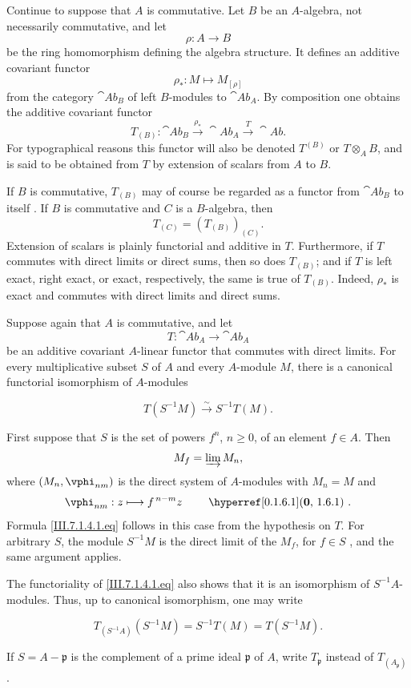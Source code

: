 \begin{env}[7.1.3]
\label{III.7.1.3}
Continue to suppose that $A$ is commutative.  Let $B$ be an
$A$-algebra, not necessarily commutative, and let
\[
  \rho:A\longrightarrow B
\]
be the ring homomorphism defining the algebra structure.  It
defines an additive covariant functor
\[
  \rho_*:M\longmapsto M_{[\rho]}
\]
from the category $\cat{Ab}_B$ of left $B$-modules to
$\cat{Ab}_A$.  By composition one obtains the additive
covariant functor
\[
  T_{(B)}:
  \cat{Ab}_B
  \xrightarrow{\rho_*}
  \cat{Ab}_A
  \xrightarrow{T}
  \cat{Ab}.
\]
For typographical reasons this functor will also be denoted
$T^{(B)}$ or $T\otimes_AB$, and is said to be obtained from $T$
by extension of scalars from $A$ to $B$.

If $B$ is commutative, $T_{(B)}$ may of course be regarded as a
functor from $\cat{Ab}_B$ to itself .  If $B$ is
commutative and $C$ is a $B$-algebra, then
\[
  T_{(C)}=(T_{(B)})_{(C)}.
\]
Extension of scalars is plainly functorial and additive in
$T$.  Furthermore, if $T$ commutes with direct limits or direct
sums, then so does $T_{(B)}$; and if $T$ is left exact, right
exact, or exact, respectively, the same is true of $T_{(B)}$.
Indeed, $\rho_*$ is exact and commutes with direct limits and
direct sums.
\end{env}

\begin{env}[7.1.4]
\label{III.7.1.4}
Suppose again that $A$ is commutative, and let
\[
  T:\cat{Ab}_A\longrightarrow\cat{Ab}_A
\]
be an additive covariant $A$-linear functor that commutes with
direct limits.  For every multiplicative subset $S$ of $A$ and
every $A$-module $M$, there is a canonical functorial
isomorphism of $A$-modules
\begin{env}[7.1.4.1]
\label{III.7.1.4.1}
\[
  T(S^{-1}M)
  \xrightarrow{\sim}
  S^{-1}T(M).
  \tag{7.1.4.1}\label{III.7.1.4.1.eq}
\]
\end{env}

First suppose that $S$ is the set of powers $f^n$,
$n\geq0$, of an element $f\in A$.  Then
\[
  M_f=\varinjlim M_n,
\]
where $(M_n,\vphi_{nm})$ is the direct system of $A$-modules
with $M_n=M$ and
\[
  \vphi_{nm}:z\longmapsto f^{\,n-m}z
  \qquad\text{\sref[0]{0.1.6.1}}.
\]
Formula \eqref{III.7.1.4.1.eq} follows in this case from the
hypothesis on $T$.  For arbitrary $S$, the module $S^{-1}M$ is
the direct limit of the $M_f$, for $f\in S$
, and the same argument applies.

The functoriality of \eqref{III.7.1.4.1.eq} also shows that it
is an isomorphism of $S^{-1}A$-modules.  Thus, up to canonical
isomorphism, one may write
\begin{env}[7.1.4.2]
\label{III.7.1.4.2}
\[
  T_{(S^{-1}A)}(S^{-1}M)
  =
  S^{-1}T(M)
  =
  T(S^{-1}M).
  \tag{7.1.4.2}\label{III.7.1.4.2.eq}
\]
\end{env}
If $S=A-\mathfrak p$ is the complement of a prime ideal
$\mathfrak p$ of $A$, write $T_{\mathfrak p}$ instead of
$T_{(A_{\mathfrak p})}$.
\end{env}

